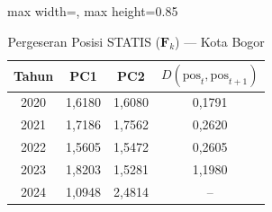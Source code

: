 \begin{table}[H]
\centering
\caption{Pergeseran Posisi STATIS ($\mathbf{F}_k$) --- Kota Bogor} \label{tab:app1jarak_statis_skor_kota_bogor}
\begin{adjustbox}{max width=\textwidth, max height=0.85\textheight}
\begin{tabular}{|c|c|c|c|}
\hline
\textbf{Tahun} & \textbf{PC1} & \textbf{PC2} & \textbf{$D(\text{pos}_t, \text{pos}_{t+1})$} \\
\hline
2020 & 1,6180 & 1,6080 & 0,1791 \\
2021 & 1,7186 & 1,7562 & 0,2620 \\
2022 & 1,5605 & 1,5472 & 0,2605 \\
2023 & 1,8203 & 1,5281 & 1,1980 \\
2024 & 1,0948 & 2,4814 & -- \\
\hline
\end{tabular}
\end{adjustbox}
\end{table}